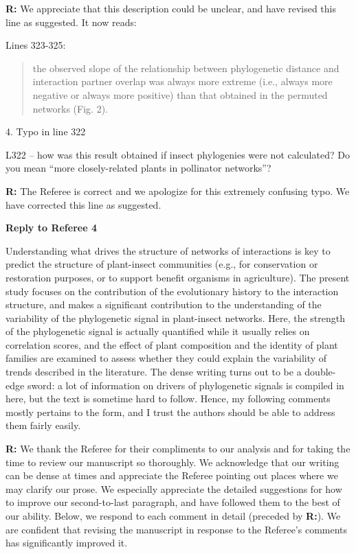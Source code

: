 \documentclass[12pt]{letter}
\newenvironment{refquote}{\bigskip \begin{it}}{\end{it}\smallskip}
\begin{document}
		\textbf{R:} We appreciate that this description could be unclear, and have revised this line as suggested. It now reads:

		Lines 323-325:

		\begin{quotation}

			the observed 
			slope of the relationship between phylogenetic distance and interaction 
			partner overlap was always more extreme (i.e., always more negative or 
			always more positive) than that obtained in the permuted networks (Fig. 2).

	    \end{quotation}


	4. Typo in line 322 

		\begin{refquote}
			L322 – how was this result obtained if insect phylogenies were not calculated? Do you mean “more closely-related plants in pollinator networks”?
		\end{refquote}


		\textbf{R:} The Referee is correct and we apologize for this extremely confusing typo. We have corrected this line as suggested.


\clearpage


{\Large \bf Reply to Referee 4} 

	\begin{refquote}
		Understanding what drives the structure of networks of interactions is key to predict the structure of plant-insect communities (e.g., for conservation or restoration purposes, or to support benefit organisms in agriculture).
		The present study focuses on the contribution of the evolutionary history to the interaction structure, and makes a significant contribution to the understanding of the variability of the phylogenetic signal in plant-insect networks. Here, the strength of the phylogenetic signal is actually quantified while it usually relies on correlation scores, and the effect of plant composition and the identity of plant families are examined to assess whether they could explain the variability of trends described in the literature.
		The dense writing turns out to be a double-edge sword: a lot of information on drivers of phylogenetic signals is compiled in here, but the text is sometime hard to follow. Hence, my following comments mostly pertains to the form, and I trust the authors should be able to address them fairly easily.
	\end{refquote}


	\textbf{R:} We thank the Referee for their compliments to our analysis and for taking the time to review our manuscript so thoroughly. We acknowledge that our writing can be dense at times and appreciate the Referee pointing out places where we may clarify our prose. We especially appreciate the detailed suggestions for how to improve our second-to-last paragraph, and have followed them to the best of our ability. Below, we respond to each comment in detail (preceded by \textbf{R:}). We are confident that revising the manuscript in response to the Referee's comments has significantly improved it.
\end{document}

